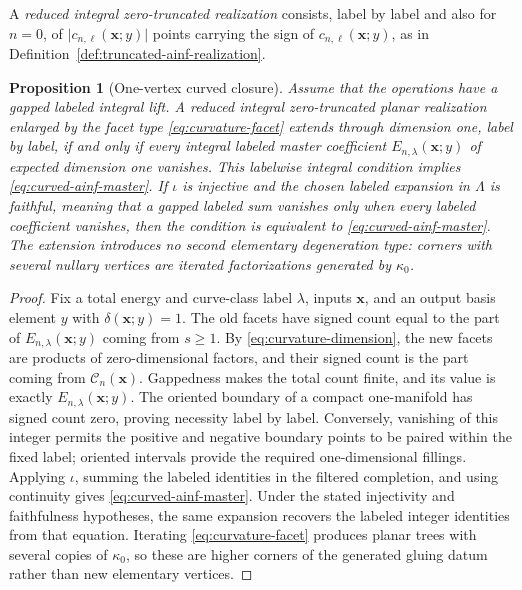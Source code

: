 \documentclass[11pt,letterpaper,twoside]{article}
\theoremstyle{plain}
\newtheorem{proposition}[theorem]{Proposition}
\theoremstyle{definition}
\theoremstyle{remark}
\begin{document}
A \emph{reduced integral zero-truncated realization} consists, label by label and also for \(n=0\), of \(\lvert c_{n,\ell}(\mathbf x;y)\rvert\) points carrying the sign of \(c_{n,\ell}(\mathbf x;y)\), as in Definition~\ref{def:truncated-ainf-realization}.

\begin{proposition}[One-vertex curved closure]\label{prop:one-vertex-curved-closure}
Assume that the operations have a gapped labeled integral lift.  A reduced integral zero-truncated planar realization enlarged by the facet type \eqref{eq:curvature-facet} extends through dimension one, label by label, if and only if every integral labeled master coefficient \(E_{n,\lambda}(\mathbf x;y)\) of expected dimension one vanishes.  This labelwise integral condition implies \eqref{eq:curved-ainf-master}.  If \(\iota\) is injective and the chosen labeled expansion in \(\Lambda\) is faithful, meaning that a gapped labeled sum vanishes only when every labeled coefficient vanishes, then the condition is equivalent to \eqref{eq:curved-ainf-master}.  The extension introduces no second elementary degeneration type: corners with several nullary vertices are iterated factorizations generated by \(\kappa_0\).
\end{proposition}

\begin{proof}
Fix a total energy and curve-class label \(\lambda\), inputs \(\mathbf x\), and an output basis element \(y\) with \(\delta(\mathbf x;y)=1\).  The old facets have signed count equal to the part of \(E_{n,\lambda}(\mathbf x;y)\) coming from \(s\geq1\).  By \eqref{eq:curvature-dimension}, the new facets are products of zero-dimensional factors, and their signed count is the part coming from \(\mathcal C_n(\mathbf x)\).  Gappedness makes the total count finite, and its value is exactly \(E_{n,\lambda}(\mathbf x;y)\).  The oriented boundary of a compact one-manifold has signed count zero, proving necessity label by label.  Conversely, vanishing of this integer permits the positive and negative boundary points to be paired within the fixed label; oriented intervals provide the required one-dimensional fillings.  Applying \(\iota\), summing the labeled identities in the filtered completion, and using continuity gives \eqref{eq:curved-ainf-master}.  Under the stated injectivity and faithfulness hypotheses, the same expansion recovers the labeled integer identities from that equation.  Iterating \eqref{eq:curvature-facet} produces planar trees with several copies of \(\kappa_0\), so these are higher corners of the generated gluing datum rather than new elementary vertices.
\end{proof}
\end{document}
